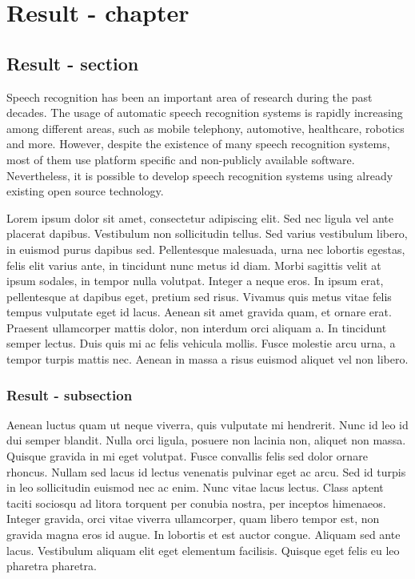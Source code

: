 \chapter{Result - chapter}
\section{Result - section}
Speech recognition has been an important area of research during the past
decades.  The usage of automatic speech recognition systems is rapidly
increasing among different areas, such as mobile telephony, automotive,
healthcare, robotics and more. However, despite the existence of many speech
recognition systems, most of them use platform specific and non-publicly
available software. Nevertheless, it is possible to develop speech recognition
systems using already existing open source technology.

Lorem ipsum dolor sit amet, consectetur adipiscing elit. Sed nec ligula vel
ante placerat dapibus. Vestibulum non sollicitudin tellus. Sed varius
vestibulum libero, in euismod purus dapibus sed. Pellentesque malesuada, urna
nec lobortis egestas, felis elit varius ante, in tincidunt nunc metus id diam.
Morbi sagittis velit at ipsum sodales, in tempor nulla volutpat. Integer a
neque eros. In ipsum erat, pellentesque at dapibus eget, pretium sed risus.
Vivamus quis metus vitae felis tempus vulputate eget id lacus. Aenean sit amet
gravida quam, et ornare erat. Praesent ullamcorper mattis dolor, non interdum
orci aliquam a. In tincidunt semper lectus. Duis quis mi ac felis vehicula
mollis. Fusce molestie arcu urna, a tempor turpis mattis nec. Aenean in massa a
risus euismod aliquet vel non libero.

\subsection{Result - subsection}
Aenean luctus quam ut neque viverra, quis vulputate mi hendrerit. Nunc id leo
id dui semper blandit. Nulla orci ligula, posuere non lacinia non, aliquet non
massa. Quisque gravida in mi eget volutpat. Fusce convallis felis sed dolor
ornare rhoncus. Nullam sed lacus id lectus venenatis pulvinar eget ac arcu. Sed
id turpis in leo sollicitudin euismod nec ac enim. Nunc vitae lacus lectus.
Class aptent taciti sociosqu ad litora torquent per conubia nostra, per
inceptos himenaeos. Integer gravida, orci vitae viverra ullamcorper, quam
libero tempor est, non gravida magna eros id augue. In lobortis et est auctor
congue. Aliquam sed ante lacus. Vestibulum aliquam elit eget elementum
facilisis. Quisque eget felis eu leo pharetra pharetra.

